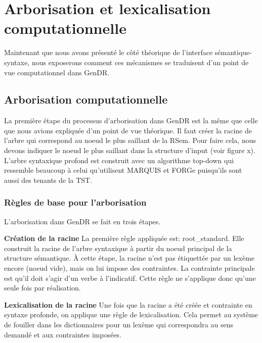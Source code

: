 
\section{Arborisation et lexicalisation computationnelle}\label{secarbolex}

Maintenant que nous avons présenté le côté théorique de l'interface sémantique-syntaxe, nous exposerons comment ces mécanismes se traduisent d'un point de vue computationnel dans GenDR.

\subsection{Arborisation computationnelle}
La première étape du processus d'arborisation dans GenDR est la même que celle que nous avions expliquée d'un point de vue théorique. Il faut créer la racine de l'arbre qui correspond au noeud le plus saillant de la RSem. Pour faire cela, nous devons indiquer le noeud le plus saillant dans la structure d'input (voir figure x). L'arbre syntaxique profond est construit avec un algorithme top-down qui ressemble beaucoup à celui qu'utilisent MARQUIS et FORGe puisqu'ils sont aussi des tenants de la TST. 

\subsubsection{Règles de base pour l'arborisation}
L'arborisation dans GenDR se fait en trois étapes.

\textbf{Création de la racine}
La première règle appliquée est: root\_standard. Elle construit la racine de l'arbre syntaxique à partir du noeud principal de la structure sémantique. À cette étape, la racine n'est pas étiquettée par un lexème encore (noeud vide), mais on lui impose des contraintes. La contrainte principale est qu'il doit s'agir d'un verbe à l'indicatif. Cette règle ne s'applique donc qu'une seule fois par réalisation.

\textbf{Lexicalisation de la racine}
Une fois que la racine a été créée et contrainte en syntaxe profonde, on applique une règle de lexicalisation. Cela permet au système de fouiller dans les dictionnaires pour un lexème qui correspondra au sens demandé et aux contraintes imposées.

